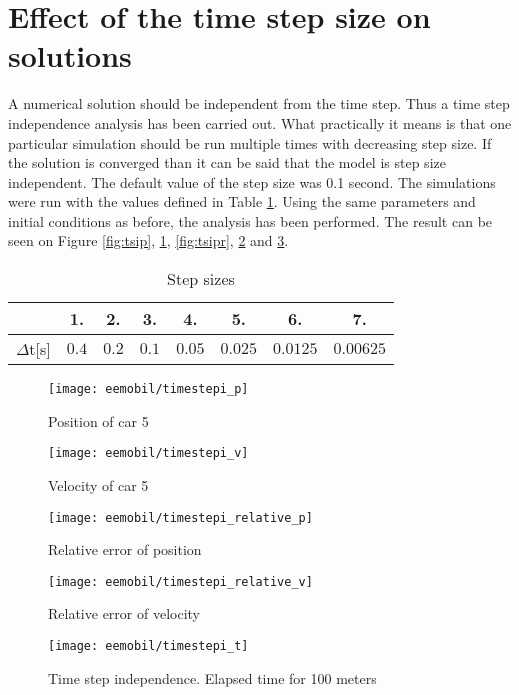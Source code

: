 		\section{Effect of the time step size on solutions}
		A numerical solution should be independent from the time step. Thus a time step independence analysis has been carried out. What practically it means is that one particular simulation should be run multiple times with decreasing step size. If the solution is converged than it can be said that the model is step size independent. The default value of the step size was 0.1 second. The simulations were run with the values defined in Table \ref{tab:timestepsizes}.
		Using the same parameters and initial conditions as before, the analysis has been performed. The result can be seen on Figure \ref{fig:tsip}, \ref{fig:tsiv}, \ref{fig:tsipr}, \ref{fig:tsivr} and \ref{fig:tsit}.
		\begin{table}
			\begin{center}
				\begin{tabular}{ |c||c|c|c|c|c|c|c|}
					\hline
					&1. & 2. & 3. & 4. & 5. & 6. & 7.\\
					\hline
					$\Delta$t[s]& $0.4$ & $0.2$ & $0.1$ & $0.05$ & $0.025$ & $0.0125$ & $0.00625$\\
					\hline
				\end{tabular}
			\end{center}
			\caption{Step sizes}
			\label{tab:timestepsizes}
		\end{table}
		\begin{figure}
			\centering
			\begin{minipage}{.5\textwidth}
				\centering
				\texttt{[image: eemobil/timestepi\_p]}
				\caption{Position of car 5}
				\label{fig:tsip}
			\end{minipage}\hfill
			\begin{minipage}{.5\textwidth}
				\centering
				\texttt{[image: eemobil/timestepi\_v]}
				\caption{Velocity of car 5}
				\label{fig:tsiv}
			\end{minipage}
		\end{figure}
		\begin{figure}
			\centering
			\begin{minipage}{.5\textwidth}
				\centering
				\texttt{[image: eemobil/timestepi\_relative\_p]}
				\caption{Relative error of position}
				\label{fig:tsipr}
			\end{minipage}\hfill
			\begin{minipage}{.5\textwidth}
				\centering
				\texttt{[image: eemobil/timestepi\_relative\_v]}
				\caption{Relative error of velocity}
				\label{fig:tsivr}
			\end{minipage}
		\end{figure}
		\begin{figure}
			\centering
			\texttt{[image: eemobil/timestepi\_t]}
			\caption{Time step independence. Elapsed time for 100 meters}
			\label{fig:tsit}
		\end{figure}
